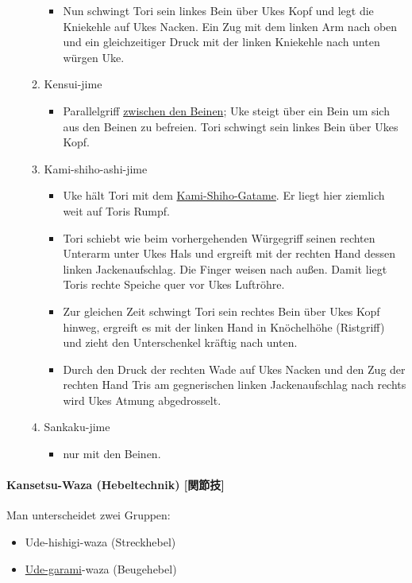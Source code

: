 \documentclass[justified, a4paper, notitlepage, captions=tableheading, nobib]{tufte-handout}
\begin{document}
\begin{itemize}
\begin{enumerate}
\begin{itemize}
\item Nun schwingt Tori sein linkes Bein über Ukes Kopf und legt die Kniekehle auf Ukes Nacken. Ein Zug mit dem linken Arm nach oben und ein gleichzeitiger Druck  mit der linken Kniekehle nach unten würgen Uke.
\end{itemize}
\item Kensui-jime 
\begin{itemize}
\item Parallelgriff \hyperref[orga527e99]{zwischen den Beinen}; Uke steigt über ein Bein um sich aus den Beinen zu befreien. Tori schwingt sein linkes Bein über Ukes Kopf.
\end{itemize}
\item Kami-shiho-ashi-jime
\begin{itemize}
\item Uke hält Tori mit dem \hyperref[orgc5066bb]{Kami-Shiho-Gatame}. Er liegt hier ziemlich weit auf Toris Rumpf.
\item Tori schiebt wie beim vorhergehenden Würgegriff seinen rechten Unterarm unter Ukes Hals und ergreift mit der rechten Hand dessen linken Jackenaufschlag. Die Finger weisen nach außen. Damit liegt Toris rechte Speiche quer vor Ukes Luftröhre.
\item Zur gleichen Zeit schwingt Tori sein rechtes Bein über Ukes Kopf hinweg, ergreift es mit der linken Hand in Knöchelhöhe (Ristgriff) und zieht den Unterschenkel kräftig nach unten.
\item Durch den Druck der rechten Wade auf Ukes Nacken und den Zug der rechten Hand Tris am gegnerischen linken Jackenaufschlag nach rechts wird Ukes Atmung abgedrosselt.
\end{itemize}
\item Sankaku-jime 
\begin{itemize}
\item nur mit den Beinen.
\end{itemize}
\end{enumerate}
\end{itemize}

\paragraph{Kansetsu-Waza (Hebeltechnik) [関節技] }
\label{sec:org8226ee3}
Man unterscheidet zwei Gruppen: 
\begin{itemize}
\item Ude-hishigi-waza (Streckhebel)
\item \hyperref[org1b248c7]{Ude-garami}-waza (Beugehebel)
\end{itemize}
\end{document}
